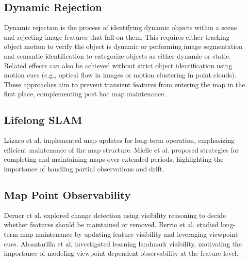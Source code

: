\subsection{Dynamic Rejection}

Dynamic rejection is the process of identifying dynamic objects within a scene and rejecting image features that fall on them. This requires either tracking object motion to verify the object is dynamic or performing image segmentation and semantic identification to categorize objects as either dynamic or static. Related effects can also be achieved without strict object identification using motion cues (e.g., optical flow in images or motion clustering in point clouds). These approaches aim to prevent transient features from entering the map in the first place, complementing post hoc map maintenance.

\subsection{Lifelong SLAM}

Lázaro et al. \cite{lazaroEfficientLongtermMapping2018} implemented map updates for long-term operation, emphasizing efficient maintenance of the map structure. Mielle et al. \cite{mielleSLAMAutocompleteCompleting2017} proposed strategies for completing and maintaining maps over extended periods, highlighting the importance of handling partial observations and drift.

\subsection{Map Point Observability}

Derner et al. \cite{dernerChangeDetectionUsing2021} explored change detection using visibility reasoning to decide whether features should be maintained or removed. Berrio et al. \cite{berrioUpdatingVisibilityFeaturebased2019,berrioLongtermMapMaintenance2020} studied long-term map maintenance by updating feature visibility and leveraging viewpoint cues. Alcantarilla et al. \cite{alcantarillaLearningVisibilityLandmarks2010} investigated learning landmark visibility, motivating the importance of modeling viewpoint-dependent observability at the feature level.
